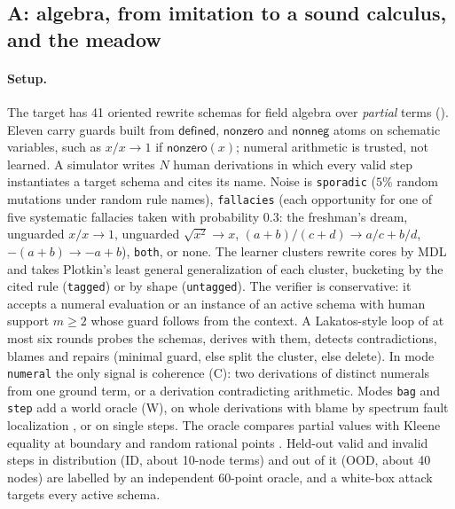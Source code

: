 \subsection{A: algebra, from imitation to a sound calculus, and the meadow}\label{sec:experiments:algebra}

\paragraph{Setup.} The target has 41 oriented rewrite schemas for field algebra over \emph{partial} terms (). Eleven carry guards built from $\mathsf{defined}$, $\mathsf{nonzero}$ and $\mathsf{nonneg}$ atoms on schematic variables, such as $x/x\to1$ if $\mathsf{nonzero}(x)$; numeral arithmetic is trusted, not learned. A simulator writes $N$ human derivations in which every valid step instantiates a target schema and cites its name. Noise is \texttt{sporadic} ($5\%$ random mutations under random rule names), \texttt{fallacies} (each opportunity for one of five systematic fallacies taken with probability $0.3$: the freshman's dream, unguarded $x/x\to1$, unguarded $\sqrt{x^2}\to x$, $(a+b)/(c+d)\to a/c+b/d$, $-(a+b)\to-a+b$), \texttt{both}, or none. The learner clusters rewrite cores by MDL and takes Plotkin's least general generalization \citep{plotkin1970note} of each cluster, bucketing by the cited rule (\texttt{tagged}) or by shape (\texttt{untagged}). The verifier is conservative: it accepts a numeral evaluation or an instance of an active schema with human support $m\ge2$ whose guard follows from the context. A Lakatos-style loop \citep{lakatos1976proofs} of at most six rounds probes the schemas, derives with them, detects contradictions, blames and repairs (minimal guard, else split the cluster, else delete). In mode \texttt{numeral} the only signal is coherence (C): two derivations of distinct numerals from one ground term, or a derivation contradicting arithmetic. Modes \texttt{bag} and \texttt{step} add a world oracle (W), on whole derivations with blame by spectrum fault localization \citep{abreu2007accuracy}, or on single steps. The oracle compares partial values with Kleene equality at boundary and random rational points \citep{schwartz1980fast,zippel1979probabilistic}. Held-out valid and invalid steps in distribution (ID, about 10-node terms) and out of it (OOD, about 40 nodes) are labelled by an independent 60-point oracle, and a white-box attack targets every active schema.

